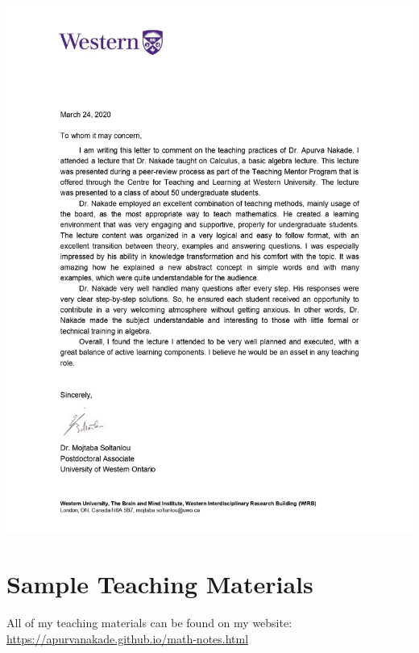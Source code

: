 \documentclass[
]{report}
\begin{document}
\includegraphics{images/2020 UWO CTL Teaching Mentor Program_page-0003.jpg}

\hypertarget{appendix-appendix}{%
\appendix {}}


\hypertarget{sample-teaching-materials}{%
\chapter{Sample Teaching Materials}\label{sample-teaching-materials}}

All of my teaching materials can be found on my website: \url{https://apurvanakade.github.io/math-notes.html}
\end{document}
